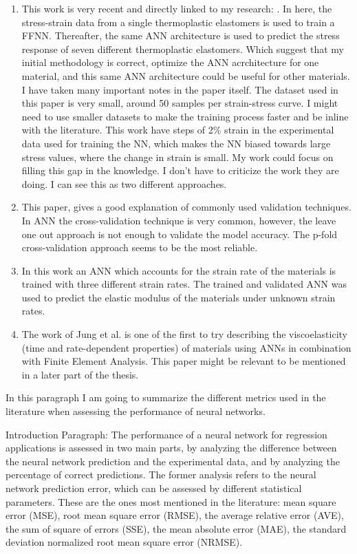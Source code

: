 \begin{enumerate}
    \item This work is very recent and directly linked to my research: \cite{rodriguez2019application}. In here, the stress-strain data from a single thermoplastic elastomers is used to train a FFNN. Thereafter, the same ANN architecture is used to predict the stress response of seven different thermoplastic elastomers. Which suggest that my initial methodology is correct, optimize the ANN acrchitecture for one material, and this same ANN  architecture could be useful for other materials. I have taken many important notes in the paper itself. The dataset used in this paper is very small, around 50 samples per strain-stress curve. I might need to use smaller datasets to make the training process faster and be inline with the literature. This work have steps of 2\% strain in the experimental data used for training the NN, which makes the NN biased towards large stress values, where the change in strain is small. My work could focus on filling this gap in the knowledge. I don't have to criticize the work they are doing. I can see this as two different approaches.
    \item This paper, \cite{wang2007review} gives a good explanation of commonly used validation techniques. In ANN the cross-validation technique is very common, however, the leave one out approach is not enough to validate the model accuracy. The p-fold cross-validation approach seems to be the most reliable.
    \item In this work \cite{xu2019artificial} an ANN which accounts for the strain rate of the materials is trained with three different strain rates. The trained and validated ANN was used to predict the elastic modulus of the materials under unknown strain rates.
    \item The work of Jung et al. \cite{jung2006neural} is one of the first to try describing the viscoelasticity (time and rate-dependent properties) of materials using ANNs in combination with Finite Element Analysis. This paper might be relevant to be mentioned in a later part of the thesis. 
\end{enumerate}

In this paragraph I am going to summarize the different metrics used in the literature when assessing the performance of neural networks.

Introduction Paragraph: The performance of a neural network for regression applications is assessed in two main parts, by analyzing the difference between the neural network prediction and the experimental data, and by analyzing the percentage of correct predictions. The former analysis refers to the neural network prediction error, which can be assessed by different statistical parameters. These are the ones most mentioned in the literature: mean square error (MSE), root mean square error (RMSE), the average relative error (AVE), the sum of square of errors (SSE), the mean absolute error (MAE), the standard deviation normalized root mean square error (NRMSE). 


